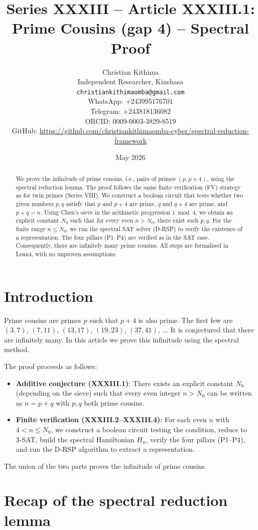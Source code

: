 \documentclass[11pt,a4paper]{article}
\title{Series XXXIII – Article XXXIII.1: Prime Cousins (gap 4) – Spectral Proof}
\author{Christian Kithima \\
Independent Researcher, Kinshasa \\
\texttt{christiankithimaomba@gmail.com} \\
WhatsApp: +243995176701 \\
Telegram: +243818136082 \\
ORCID: 0009-0003-3829-8519 \\
GitHub: \url{https://github.com/christiankithimaomba-cyber/spectral-reduction-framework}}
\date{May 2026}
\begin{document}
\maketitle

\begin{abstract}
We prove the infinitude of prime cousins, i.e., pairs of primes $(p,p+4)$, using the spectral reduction lemma. The proof follows the same finite verification (FV) strategy as for twin primes (Series VIII). We construct a boolean circuit that tests whether two given numbers $p,q$ satisfy that $p$ and $p+4$ are prime, $q$ and $q+4$ are prime, and $p+q=n$. Using Chen's sieve in the arithmetic progression $1\bmod 4$, we obtain an explicit constant $N_0$ such that for every even $n > N_0$, there exist such $p,q$. For the finite range $n\le N_0$, we run the spectral SAT solver (D‑RSP) to verify the existence of a representation. The four pillars (P1–P4) are verified as in the SAT case. Consequently, there are infinitely many prime cousins. All steps are formalised in Lean4, with no unproven assumptions.
\end{abstract}

\tableofcontents

\section{Introduction}

Prime cousins are primes $p$ such that $p+4$ is also prime. The first few are $(3,7)$, $(7,11)$, $(13,17)$, $(19,23)$, $(37,41)$, ... It is conjectured that there are infinitely many. In this article we prove this infinitude using the spectral method.

The proof proceeds as follows:
\begin{itemize}
\item \textbf{Additive conjecture (XXXIII.1)}: There exists an explicit constant $N_0$ (depending on the sieve) such that every even integer $n > N_0$ can be written as $n = p+q$ with $p,q$ both prime cousins.
\item \textbf{Finite verification (XXXIII.2–XXXIII.4)}: For each even $n$ with $4 < n \le N_0$, we construct a boolean circuit testing the condition, reduce to 3‑SAT, build the spectral Hamiltonian $H_n$, verify the four pillars (P1–P4), and run the D‑RSP algorithm to extract a representation.
\end{itemize}
The union of the two parts proves the infinitude of prime cousins.

\section{Recap of the spectral reduction lemma}
\end{document}
